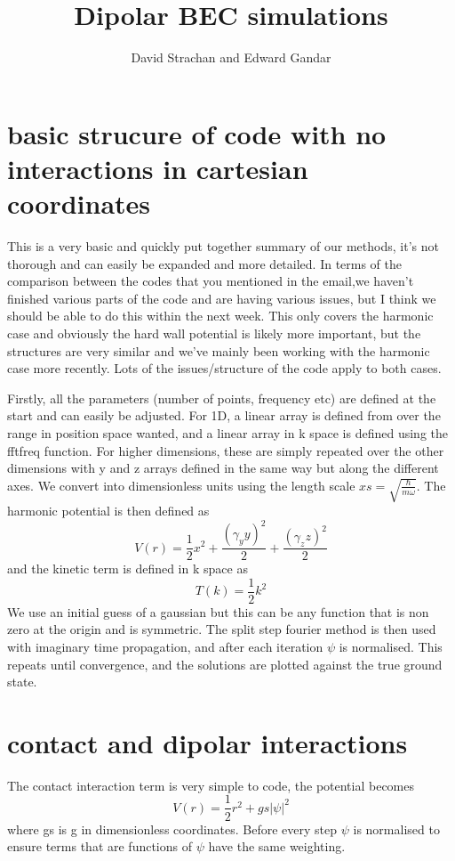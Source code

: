 \documentclass[12pt]{article}
\begin{document}
\author{ David Strachan and Edward Gandar }
\title{Dipolar BEC simulations}

\maketitle
\section{basic strucure of code with no interactions in cartesian coordinates}
This is a very basic and quickly put together summary of our methods, it's not thorough and can easily be expanded and more detailed. In terms of the comparison between the codes that you mentioned in the email,we haven't finished various parts of the code and are having various issues, but I think we should be able to do this within the next week. This only covers the harmonic case and obviously the hard wall potential is likely more important, but the structures are very similar and we've mainly been working with the harmonic case more recently. Lots of the issues/structure of the code apply to both cases.

Firstly, all the parameters (number of points, frequency etc) are defined at the start and can easily be adjusted. For 1D, a linear array is defined from over the range in position space wanted, and a linear array in k space is defined using the fftfreq function. For higher dimensions, these are simply repeated over the other dimensions with y and z arrays defined in the same way but along the different axes. We convert into dimensionless units using the length scale $xs = \sqrt{\frac{\hbar}{m\omega}}$. The harmonic potential is then defined as 
\begin{equation}
V(r) = \frac{1}{2}x^{2}+\frac{(\gamma_yy)^{2}}{2}+\frac{(\gamma_zz)^{2}}{2}
\end{equation}
and the kinetic term is defined in k space as 
\begin{equation}
T(k) = \frac{1}{2}k^{2}
\end{equation} 
We use an initial guess of a gaussian but this can be any function that is non zero at the origin and is symmetric. The split step fourier method is then used with imaginary time propagation, and after each iteration $\psi$ is normalised. This repeats until convergence, and the solutions are plotted against the true ground state.
\section{contact and dipolar interactions}
The contact interaction term is very simple to code, the potential becomes 
\begin{equation}
V(r) = \frac{1}{2}r^{2}+gs|\psi|^{2}
\end{equation}
where gs is g in dimensionless coordinates. Before every step $\psi$ is normalised to ensure terms that are functions of $\psi$ have the same weighting.
 
\end{document}
